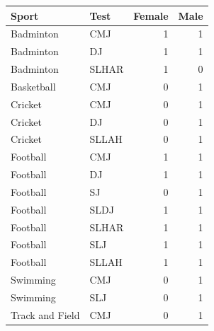 \begin{tabular}{llrr}
\toprule
Sport & Test & Female & Male \\
\midrule
Badminton & CMJ & 1 & 1 \\
Badminton & DJ & 1 & 1 \\
Badminton & SLHAR & 1 & 0 \\
Basketball & CMJ & 0 & 1 \\
Cricket & CMJ & 0 & 1 \\
Cricket & DJ & 0 & 1 \\
Cricket & SLLAH & 0 & 1 \\
Football & CMJ & 1 & 1 \\
Football & DJ & 1 & 1 \\
Football & SJ & 0 & 1 \\
Football & SLDJ & 1 & 1 \\
Football & SLHAR & 1 & 1 \\
Football & SLJ & 1 & 1 \\
Football & SLLAH & 1 & 1 \\
Swimming & CMJ & 0 & 1 \\
Swimming & SLJ & 0 & 1 \\
Track and Field & CMJ & 0 & 1 \\
\bottomrule
\end{tabular}
